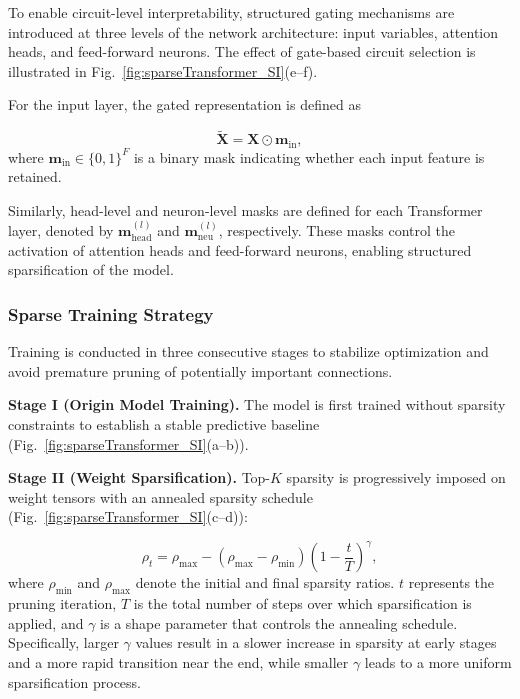 \documentclass[11pt]{article}
\begin{document}
To enable circuit-level interpretability, structured gating mechanisms are introduced at three levels of the network architecture: input variables, attention heads, and feed-forward neurons\cite{louizos2018learningsparseneuralnetworks}. The effect of gate-based circuit selection is illustrated in Fig.~\ref{fig:sparseTransformer_SI}(e--f).

For the input layer, the gated representation is defined as

\begin{equation}
    \tilde{\mathbf{X}}=\mathbf{X}\odot \mathbf{m}_{\mathrm{in}},
\end{equation}
where $\mathbf{m}_{\mathrm{in}}\in\{0,1\}^{F}$ is a binary mask indicating whether each input feature is retained.

Similarly, head-level and neuron-level masks are defined for each Transformer layer, denoted by $\mathbf{m}_{\mathrm{head}}^{(l)}$ and $\mathbf{m}_{\mathrm{neu}}^{(l)}$, respectively. These masks control the activation of attention heads and feed-forward neurons\cite{TFT}, enabling structured sparsification of the model.

\subsubsection{Sparse Training Strategy}

Training is conducted in three consecutive stages to stabilize optimization and avoid premature pruning of potentially important connections\cite{NIPS2015_three_step_pruning}.

\textbf{Stage I (Origin Model Training).}
The model is first trained without sparsity constraints to establish a stable predictive baseline (Fig.~\ref{fig:sparseTransformer_SI}(a--b)).

\textbf{Stage II (Weight Sparsification).}
Top-$K$ sparsity is progressively imposed on weight tensors with an annealed sparsity schedule\cite{zhu2017prunepruneexploringefficacy} (Fig.~\ref{fig:sparseTransformer_SI}(c--d)):

\begin{equation}
    \rho_t=\rho_{\max}-(\rho_{\max}-\rho_{\min})\left(1-\frac{t}{T}\right)^{\gamma},
\end{equation}
where $\rho_{\min}$ and $\rho_{\max}$ denote the initial and final sparsity ratios. $t$ represents the pruning iteration, $T$ is the total number of steps over which sparsification is applied, and $\gamma$ is a shape parameter that controls the annealing schedule. Specifically, larger $\gamma$ values result in a slower increase in sparsity at early stages and a more rapid transition near the end, while smaller $\gamma$ leads to a more uniform sparsification process.
\end{document}

